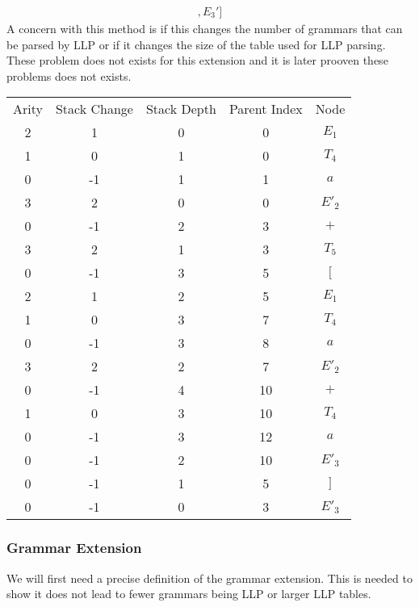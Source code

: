 \documentclass[a4paper,12pt]{article}
\theoremstyle{definition}
\begin{document}
\begin{gather*}
  [E_1, T_4, a, E_2', +, T_5, [, E_1, T_4, a, E_2', +, T_4, a, E_3', ], E_3']
\end{gather*}
A concern with this method is if this changes the number of grammars that can be parsed by LLP or if it changes the size of the table used for LLP parsing. These problem does not exists for this extension and it is later prooven these problems does not exists. 
\begin{table}[H]
  \centering
  \begin{tabular}{c|c|c|c|c}
    Arity & Stack Change & Stack Depth & Parent Index & Node \\
    2 & 1  & 0 & 0  & $E_1$  \\ \hline
    1 & 0  & 1 & 0  & $T_4$  \\ \hline
    0 & -1 & 1 & 1  & $a$    \\ \hline
    3 & 2  & 0 & 0  & $E'_2$ \\ \hline
    0 & -1 & 2 & 3  & $+$    \\ \hline
    3 & 2  & 1 & 3  & $T_5$  \\ \hline
    0 & -1 & 3 & 5  & $[$    \\ \hline
    2 & 1  & 2 & 5  & $E_1$  \\ \hline
    1 & 0  & 3 & 7  & $T_4$  \\ \hline
    0 & -1 & 3 & 8  & $a$    \\ \hline
    3 & 2  & 2 & 7  & $E'_2$ \\ \hline
    0 & -1 & 4 & 10 & $+$    \\ \hline
    1 & 0  & 3 & 10 & $T_4$  \\ \hline
    0 & -1 & 3 & 12 & $a$    \\ \hline
    0 & -1 & 2 & 10 & $E'_3$ \\ \hline
    0 & -1 & 1 & 5  & $]$    \\ \hline
    0 & -1 & 0 & 3  & $E'_3$
  \end{tabular}
\end{table}

\subsubsection{Grammar Extension}
We will first need a precise definition of the grammar extension. This is needed to show it does not lead to fewer grammars being LLP or larger LLP tables. 
\end{document}

